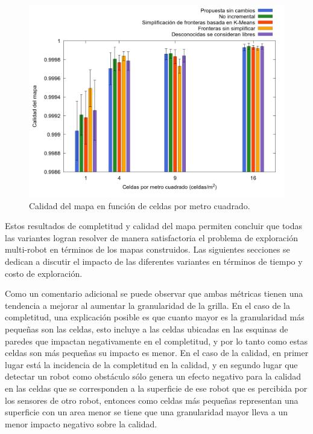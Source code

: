\begin{figure}[H]
  \centerfloat
  \includegraphics[clip=true, width=\graphlen]{imagenes/graficas_chicas_nuevas/graficas_histo_num/quality_9986/map_quality.png}
  \caption{Calidad del mapa en función de celdas por metro cuadrado.}\label{fig:gra:todo:cal}
\end{figure}

Estos resultados de completitud y calidad del mapa permiten concluir que todas
las variantes logran resolver de manera satisfactoria el problema de
exploración multi-robot en términos de los mapas construidos. Las
siguientes secciones se dedican a discutir el impacto de las diferentes
variantes en términos de tiempo y costo de exploración.

Como un comentario adicional se puede observar que ambas métricas tienen una
tendencia a mejorar al aumentar la granularidad de la grilla. En el caso de la
completitud, una explicación posible es que cuanto mayor es la granularidad
más pequeñas son las celdas, esto incluye a las celdas ubicadas en las esquinas de
paredes que impactan negativamente en el completitud, y por lo tanto como estas celdas son
más pequeñas su impacto es menor. En el caso de la
calidad, en primer lugar está la incidencia de la completitud en la calidad, y en
segundo lugar que detectar un robot como obstáculo sólo genera un efecto
negativo para la calidad en las celdas que se corresponden a la superficie
de ese robot que es percibida por los sensores de otro robot, entonces como
celdas más pequeñas representan una superficie con un area menor se tiene que una
granularidad mayor lleva a un menor impacto negativo sobre la calidad.

